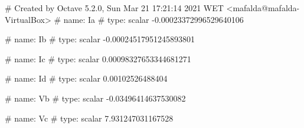 # Created by Octave 5.2.0, Sun Mar 21 17:21:14 2021 WET <mafalda@mafalda-VirtualBox>
# name: Ia
# type: scalar
-0.00023372996529640106


# name: Ib
# type: scalar
-0.00024517951245893801


# name: Ic
# type: scalar
0.00098327653344681271


# name: Id
# type: scalar
0.00102526488404


# name: Vb
# type: scalar
-0.03496414637530082


# name: Vc
# type: scalar
7.931247031167528


